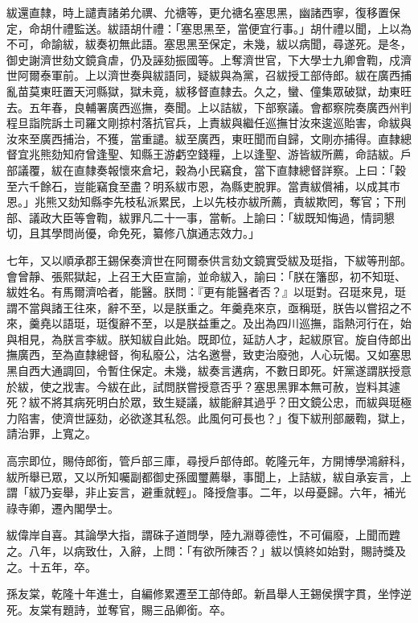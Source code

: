 \begin{pinyinscope}
紱還直隸，時上譴責諸弟允禩、允禟等，更允禟名塞思黑，幽諸西寧，復移置保定，命胡什禮監送。紱語胡什禮：「塞思黑至，當便宜行事。」胡什禮以聞，上以為不可，命諭紱，紱奏初無此語。塞思黑至保定，未幾，紱以病聞，尋遂死。是冬，御史謝濟世劾文鏡貪虐，仍及誣劾振國等。上奪濟世官，下大學士九卿會鞫，戍濟世阿爾泰軍前。上以濟世奏與紱語同，疑紱與為黨，召紱授工部侍郎。紱在廣西捕亂苗莫東旺置天河縣獄，獄未竟，紱移督直隸去。久之，蠻、僮集眾破獄，劫東旺去。五年春，良輔署廣西巡撫，奏聞。上以詰紱，下部察議。會都察院奏廣西州判程旦詣院訴土司羅文剛掠村落抗官兵，上責紱與繼任巡撫甘汝來逡巡貽害，命紱與汝來至廣西捕治，不獲，當重譴。紱至廣西，東旺聞而自歸，文剛亦捕得。直隸總督宜兆熊劾知府曾逢聖、知縣王游虧空錢糧，上以逢聖、游皆紱所薦，命詰紱。戶部議覆，紱在直隸奏報懷來倉圮，穀為小民竊食，當下直隸總督詳察。上曰：「穀至六千餘石，豈能竊食至盡？明系紱市恩，為縣吏脫罪。當責紱償補，以成其市恩。」兆熊又劾知縣李先枝私派累民，上以先枝亦紱所薦，責紱欺罔，奪官；下刑部、議政大臣等會鞫，紱罪凡二十一事，當斬。上諭曰：「紱既知悔過，情詞懇切，且其學問尚優，命免死，纂修八旗通志效力。」

七年，又以順承郡王錫保奏濟世在阿爾泰供言劾文鏡實受紱及珽指，下紱等刑部。會曾靜、張熙獄起，上召王大臣宣諭，並命紱入，諭曰：「朕在籓邸，初不知珽、紱姓名。有馬爾濟哈者，能醫。朕問：『更有能醫者否？』以珽對。召珽來見，珽謂不當與諸王往來，辭不至，以是朕重之。年羹堯來京，亟稱珽，朕告以嘗招之不來，羹堯以語珽，珽復辭不至，以是朕益重之。及出為四川巡撫，詣熱河行在，始與相見，為朕言李紱。朕知紱自此始。既即位，延訪人才，起紱原官。旋自侍郎出撫廣西，至為直隸總督，徇私廢公，沽名邀譽，致吏治廢弛，人心玩愒。又如塞思黑自西大通調回，令暫住保定。未幾，紱奏言遘病，不數日即死。奸黨遂謂朕授意於紱，使之戕害。今紱在此，試問朕嘗授意否乎？塞思黑罪本無可赦，豈料其遽死？紱不將其病死明白於眾，致生疑議，紱能辭其過乎？田文鏡公忠，而紱與珽極力陷害，使濟世誣劾，必欲遂其私怨。此風何可長也？」復下紱刑部嚴鞫，獄上，請治罪，上寬之。

高宗即位，賜侍郎銜，管戶部三庫，尋授戶部侍郎。乾隆元年，方開博學鴻辭科，紱所舉已眾，又以所知囑副都御史孫國璽薦舉，事聞上，上詰紱，紱自承妄言，上謂「紱乃妄舉，非止妄言，避重就輕」。降授詹事。二年，以母憂歸。六年，補光祿寺卿，遷內閣學士。

紱偉岸自喜。其論學大指，謂硃子道問學，陸九淵尊德性，不可偏廢，上聞而韙之。八年，以病致仕，入辭，上問：「有欲所陳否？」紱以慎終如始對，賜詩獎及之。十五年，卒。

孫友棠，乾隆十年進士，自編修累遷至工部侍郎。新昌舉人王錫侯撰字貫，坐悖逆死。友棠有題詩，並奪官，賜三品卿銜。卒。


\end{pinyinscope}
